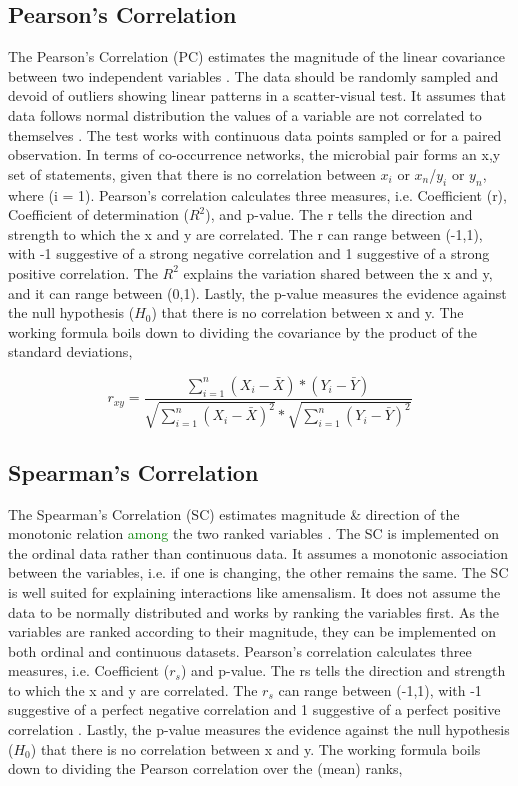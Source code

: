 \subsection{Pearson's Correlation}
The Pearson's Correlation (PC) estimates the magnitude of the linear covariance between two independent variables \cite{schober_2018_correlation}. The data should be randomly sampled and devoid of outliers showing linear patterns in a scatter-visual test. It assumes that data follows normal distribution the values of a variable are not correlated to themselves \cite{schober_2018_correlation}. The test works with continuous data points sampled or for a paired observation. In terms of co-occurrence networks, the microbial pair forms an {x,y} set of statements, given that there is no correlation between $x_{i}$ or $x_{n}$/$y_{i}$ or $y_{n}$, where (i = 1). Pearson's correlation calculates three measures, i.e. Coefficient (r), Coefficient of determination ($R^{2}$), and p-value. The r tells the direction and strength to which the x and y are correlated. The r can range between (-1,1), with -1 suggestive of a strong negative correlation and 1 suggestive of a strong positive correlation. The $R^{2}$ explains the variation shared between the x and y, and it can range between (0,1). Lastly, the p-value measures the evidence against the null hypothesis ($H_{0}$) that there is no correlation between x and y. The working formula boils down to dividing the covariance by the product of the standard deviations,

$$r_{xy} = \frac{\sum_{i=1}^{n} (X_{i} - \bar{X}) * (Y_{i} - \bar{Y})}{\sqrt{\sum_{i=1}^{n} (X_{i} - \bar{X})^{2}} * \sqrt{\sum_{i=1}^{n} (Y_{i} - \bar{Y})^{2}}}$$

\subsection{Spearman's Correlation}
The Spearman's Correlation (SC) estimates magnitude \& direction of the monotonic relation \textcolor{green}{among} the two ranked variables \cite{dewinter_2016_comparing}. The SC is implemented on the ordinal data rather than continuous data. It assumes a monotonic association between the variables, i.e. if one is changing, the other remains the same. The SC is well suited for explaining interactions like amensalism. It does not assume the data to be normally distributed and works by ranking the variables first. As the variables are ranked according to their magnitude, they can be implemented on both ordinal and continuous datasets. Pearson's correlation calculates three measures, i.e. Coefficient ($r_{s}$) and p-value. The rs tells the direction and strength to which the x and y are correlated. The $r_{s}$ can range between (-1,1), with -1 suggestive of a perfect negative correlation and 1 suggestive of a perfect positive correlation \cite{dewinter_2016_comparing}. Lastly, the p-value measures the evidence against the null hypothesis ($H_{0}$) that there is no correlation between x and y. The working formula boils down to dividing the Pearson correlation over the (mean) ranks,

